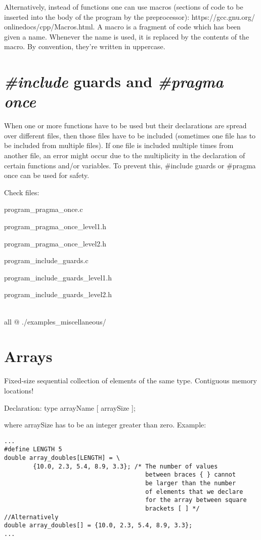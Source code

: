 \documentclass[11pt]{article}
\begin{document}
Alternatively, instead of functions one can use macros (sections of code to be inserted into the body of the program by the preprocessor): https://gcc.gnu.org/ onlinedocs/cpp/Macros.html. A macro is a fragment of code which has been given a name. Whenever the name is used, it is replaced by the contents of the macro. By convention, they're written in uppercase.


\section{\textit{\#include} guards and \textit{\#pragma once}}

When one or more functions have to be used but their declarations are spread over different files, then those files have to be included (sometimes one file has to be included from multiple files). If one file is included multiple times from another file, an error might occur due to the multiplicity in the declaration of certain functions and/or variables. To prevent this, \#include guards or \#pragma once can be used for safety.

Check files:

program\_pragma\_once.c

program\_pragma\_once\_level1.h

program\_pragma\_once\_level2.h

program\_include\_guards.c

program\_include\_guards\_level1.h

program\_include\_guards\_level2.h

\ \\

all @ ./examples\_miscellaneous/


\section{Arrays}

Fixed-size sequential collection of elements of the same type. Contiguous memory locations!

Declaration: type arrayName [ arraySize ];

where arraySize has to be an integer greater than zero. Example:

\begin{lstlisting}
...
#define LENGTH 5
double array_doubles[LENGTH] = \
        {10.0, 2.3, 5.4, 8.9, 3.3}; /* The number of values
                                       between braces { } cannot
                                       be larger than the number
                                       of elements that we declare
                                       for the array between square
                                       brackets [ ] */
//Alternatively
double array_doubles[] = {10.0, 2.3, 5.4, 8.9, 3.3};
...
\end{lstlisting}
\end{document}
